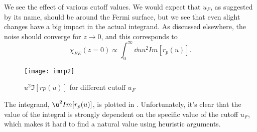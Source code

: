 \documentclass[11pt]{article}
\begin{document}
	We see  the effect of various cutoff values.
	We would expect that $u_F$, as suggested by its name, should be around the Fermi surface, but we see that even slight changes have a big impact in the actual integrand.
	As discussed elsewhere, the noise should converge for $z\rightarrow 0$, and this corresponds to
	\begin{equation}
		\chi_{EE}(z = 0) \propto \int_0^\infty \dd{u} u^2 Im[r_p(u)].
	\end{equation}

	\begin{figure}[htp]
		\centering
		\texttt{[image: imrp2]}
		\caption{$u^2 \Im[rp(u)]$ for different cutoff $u_F$} \label{fig:u2imrpVsCutoff}
	\end{figure}
	The integrand, $\u^2 Im[r_p(u)]$, is plotted in .
	Unfortunately, it's clear that the value of the integral is strongly dependent on the specific value of the cutoff $u_F$, which makes it hard to find a natural value using heuristic arguments.


	\newpage
	\listoftodos
	\newpage
	\printbibliography
\end{document}
